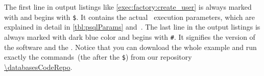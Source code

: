 The first line in output listings like \cref{exec:factory:create_user} is always marked with {\color{listing-tool-command}{dark red color}} and begins with {\color{listing-tool-command}\texttt{\$}}.
It contains the actual \psql\ execution parameters, which are explained in detail in \cref{tbl:psqlParams} and~\cite{PGDG:PD:P}.
The last line in the output listings is always marked with {\color{listing-tool-result}dark blue color} and begins with {\color{listing-tool-result}\texttt{\#}}.
It signifies the version of the software and the .
Notice that you can download the whole example and run exactly the commands~(the {\color{listing-tool-command}{red text}} after the {\color{listing-tool-command}\texttt{\$}}) from our repository \url{\databasesCodeRepo}.%
%
\FloatBarrier%
\endhsection%
